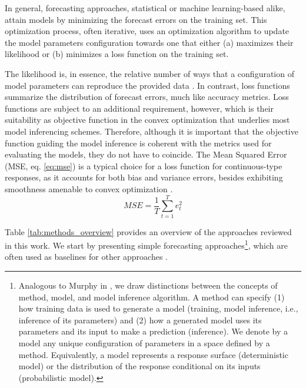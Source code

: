 In general, forecasting approaches, statistical or machine learning-based alike, attain models by minimizing the forecast errors on the training set. This optimization process, often iterative, uses an optimization algorithm to update the model parameters configuration towards one that either (a) maximizes their likelihood or (b) minimizes a loss function on the training set.

The likelihood is, in essence, the relative number of ways that a configuration of model parameters can reproduce the provided data \cite{mcelreath2020rethinking}. In contrast, loss functions summarize the distribution of forecast errors, much like accuracy metrics. Loss functions are subject to an additional requirement, however, which is their suitability as objective function in the convex optimization that underlies most model inferencing schemes. Therefore, although it is important that the objective function guiding the model inference is coherent with the metrics used for evaluating the models, they do not have to coincide.
The Mean Squared Error (MSE, eq. \ref{eq:mse}) is a typical choice for a loss function for continuous-type responses, as it accounts for both bias and variance errors, besides exhibiting smoothness amenable to convex optimization \cite{goodfellow2016deep}.
\begin{equation}\label{eq:mse}
    MSE = \frac{1}{T}\sum_{t=1}^T e^2_t
\end{equation}

Table \ref{tab:methods_overview} provides an overview of the approaches reviewed in this work. We start by presenting simple forecasting approaches\footnote[1]{Analogous to Murphy in \cite{murphy2012probabilistic}, we draw distinctions between the concepts of method, model, and model inference algorithm. A method can specify (1) how training data is used to generate a model (training, model inference, i.e., inference of its parameters) and (2) how a generated model uses its parameters and its input to make a prediction (inference). We denote by a model any unique configuration of parameters in a space defined by a method. Equivalently, a model represents a response surface (deterministic model) or the distribution of the response conditional on its inputs (probabilistic model).}, which are often used as baselines for other approaches \cite{hyndman2018principles}.



